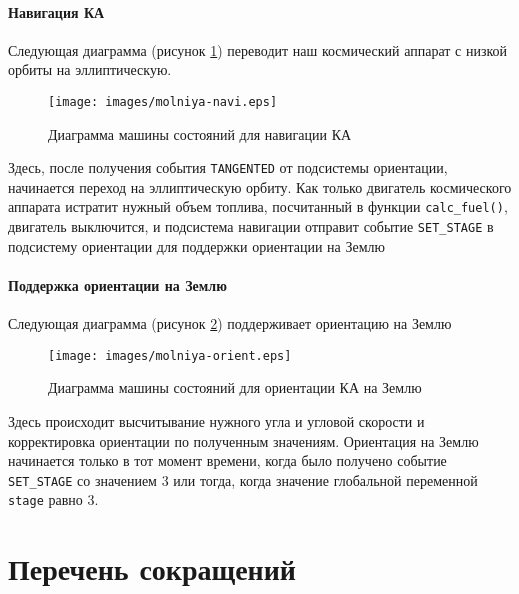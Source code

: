 \documentclass[12pt,a4paper]{article}
\begin{document}
\paragraph{Навигация КА} Следующая диаграмма (рисунок \ref{Pic:Molniya-navi}) переводит наш космический аппарат с низкой орбиты на эллиптическую.

\begin{figure}[tbh]
  \begin{center}
    \texttt{[image: images/molniya-navi.eps]}
    \caption{Диаграмма машины состояний для навигации КА}
    \label{Pic:Molniya-navi}
  \end{center}
\end{figure}

Здесь, после получения события \verb'TANGENTED' от подсистемы ориентации, начинается переход на эллиптическую орбиту. Как только двигатель космического аппарата истратит нужный объем топлива, посчитанный в функции \verb'calc_fuel()', двигатель выключится, и подсистема навигации отправит событие \verb'SET_STAGE' в подсистему ориентации для поддержки ориентации на Землю

\clearpage
\paragraph{Поддержка ориентации на Землю} Следующая диаграмма (рисунок \ref{Pic:Molniya-orient}) поддерживает ориентацию на Землю

\begin{figure}[tbh]
  \begin{center}
    \texttt{[image: images/molniya-orient.eps]}
    \caption{Диаграмма машины состояний для ориентации КА на Землю}
    \label{Pic:Molniya-orient}
  \end{center}
\end{figure}

Здесь происходит высчитывание нужного угла и угловой скорости и корректировка ориентации по полученным значениям.
Ориентация на Землю начинается только в тот момент времени, когда было получено событие \verb'SET_STAGE' со значением 3 или тогда, когда значение глобальной переменной \verb'stage' равно 3.
   
\section*{Перечень сокращений}
\end{document}
